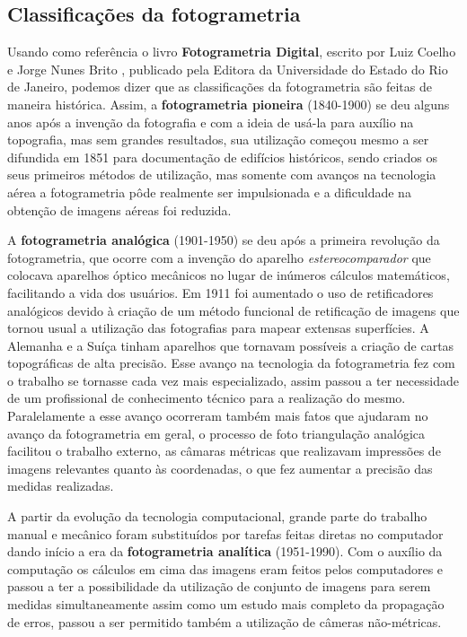 \subsection{Classificações da fotogrametria}
Usando como referência o  livro \textbf{Fotogrametria Digital}, escrito por Luiz Coelho e Jorge Nunes Brito \cite{bib:livrofotogrametria}, publicado pela Editora da Universidade do Estado do Rio de Janeiro, podemos dizer que as classificações da fotogrametria são feitas de maneira histórica. Assim, a \textbf{fotogrametria pioneira} (1840-1900) se deu alguns anos após a invenção da fotografia e com a ideia de usá-la para auxílio na topografia, mas sem grandes resultados, sua utilização começou mesmo a ser difundida em 1851 para documentação de edifícios históricos, sendo criados os seus primeiros métodos de utilização, mas somente com avanços na tecnologia aérea a fotogrametria pôde realmente ser impulsionada e a dificuldade na obtenção de imagens aéreas foi reduzida. 

A \textbf{fotogrametria analógica} (1901-1950) se deu após a primeira revolução da fotogrametria, que ocorre com a invenção do aparelho \textit{estereocomparador} que colocava aparelhos óptico mecânicos no lugar de inúmeros cálculos matemáticos, facilitando a vida dos usuários. Em 1911 foi aumentado o uso de retificadores analógicos devido à criação de um método funcional de retificação de imagens que tornou usual a utilização das fotografias para mapear extensas superfícies. A Alemanha e a Suíça tinham aparelhos que tornavam possíveis a criação de cartas topográficas de alta precisão. Esse avanço na tecnologia da fotogrametria fez com o trabalho se tornasse cada vez mais especializado, assim passou a ter necessidade de um profissional de conhecimento técnico para a realização do mesmo. Paralelamente a esse avanço ocorreram também mais fatos que ajudaram no avanço da fotogrametria em geral, o processo de foto triangulação analógica facilitou o trabalho externo, as câmaras métricas que realizavam impressões de imagens relevantes quanto às coordenadas, o que fez aumentar a precisão das medidas realizadas.

A partir da evolução da tecnologia computacional, grande parte do trabalho manual e mecânico foram substituídos por tarefas feitas diretas no computador dando início a era da \textbf{fotogrametria analítica} (1951-1990). Com o auxílio da computação os cálculos em cima das imagens eram feitos pelos computadores e passou a ter a possibilidade da utilização de conjunto de imagens para serem medidas simultaneamente assim como um estudo mais completo da propagação de erros, passou a ser permitido também a utilização de câmeras não-métricas.

